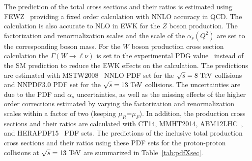 The prediction of the total cross sections and their ratios is estimated using FEWZ~\cite{Gavin:2010az,Gavin:2012sy,Li:2012wna} providing a fixed order calculation with NNLO accuracy in QCD. The calculation is also accurate to NLO in EWK for the $Z$ boson production. The factorization and renormalization scales and the scale of the $\alpha_s(Q^2)$ are set to the corresponding boson mass. For the $W$ boson production cross section calculation the $\Gamma(W \rightarrow \ell \nu)$ is set to the experimental PDG value~\cite{Agashe:2014kda} instead of the SM prediction to reduce the EWK effects on the calculation. The predictions are estimated with MSTW2008~\cite{MSTW} NNLO PDF set for the $\sqrt{s}=8~\mathrm{Te\kern -0.1em V}$ collisions and NNPDF3.0 PDF set for the $\sqrt{s}=13~\mathrm{Te\kern -0.1em V}$ collisions. The uncertainties are due to the PDF and $\alpha_s$ uncertainties, as well as the missing effects of the higher order corrections estimated by varying the factorization and renormalization scales within a factor of two (keeping $\mu_R$=$\mu_F$). In addition, the production cross sections and their ratios are calculated with CT14, MMHT2014, ABM12LHC~\cite{Alekhin:2013nda}, and HERAPDF15~\cite{Abramowicz:2015mha} PDF sets. The predictions of the inclusive total production cross sections and their ratios using these PDF sets for the proton-proton collisions at $\sqrt{s}=13~\mathrm{Te\kern -0.1em V}$ are summarized in Table~\ref{tab:pdfXsec}. 

